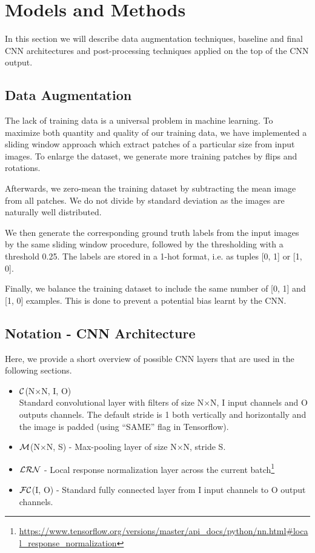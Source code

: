 \documentclass[10pt,conference,compsocconf]{IEEEtran}
\newcommand{\conv}[3]{$ \cal{C} $(#1$ \times  $#1, #2, #3)}
\newcommand{\maxpool}[2]{$ \cal{M} $(#1$ \times $#1, #2)}
\newcommand{\lrn}{$ \cal{LRN}~$}
\newcommand{\fc}[2]{$ \cal{FC} $(#1, #2)}
\begin{document}
\section{Models and Methods}
\label{sec:MM}
In this section we will describe data augmentation techniques, baseline and final CNN architectures and post-processing techniques applied on the top of the CNN output.

\subsection{Data Augmentation}
\label{subsec:preprocessing}
The lack of training data is a universal problem in machine learning. To maximize both quantity and quality of our training data, we have implemented a sliding window approach which extract patches of a particular size from input images. To enlarge the dataset, we generate more training patches by flips and rotations.

Afterwards, we zero-mean the training dataset by subtracting the mean image from all patches. We do not divide by standard deviation as the images are naturally well distributed.

We then generate the corresponding ground truth labels from the input images by the same sliding window procedure, followed by the thresholding with a threshold 0.25. The labels are stored in a 1-hot format, i.e. as tuples [0, 1] or [1, 0].

Finally, we balance the training dataset to include the same number of [0, 1] and [1, 0] examples. This is done to prevent a potential bias learnt by the CNN.

\subsection{Notation - CNN Architecture}
Here, we provide a short overview of possible CNN layers that are used in the following sections.
\begin{itemize}
	\item \conv{N}{I}{O} \\
	Standard convolutional layer with filters of size N$ \times $N, I input channels and O outputs channels. The default stride is 1 both vertically and horizontally and the image is padded (using ``SAME'' flag in Tensorflow).
	\item \maxpool{N}{S} - Max-pooling layer of size N$ \times $N, stride S.
	\item \lrn - Local response normalization layer across the current batch\footnote{\url{https://www.tensorflow.org/versions/master/api_docs/python/nn.html\#local_response_normalization}}
	\item \fc{I}{O} - Standard fully connected layer from I input channels to O output channels.
\end{itemize}
\end{document}

